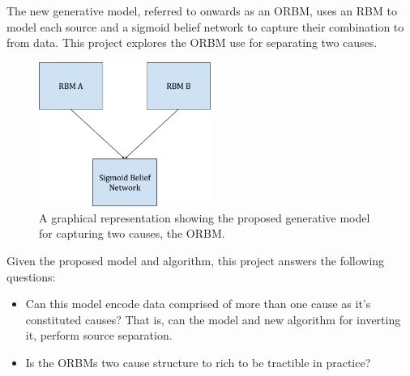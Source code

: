 The new generative model, referred to onwards as an ORBM, uses an RBM to model each source and a sigmoid belief network to capture their combination to from data. This project explores the ORBM use for separating two causes.

\begin{figure}[h]
\begin{center}
  \includegraphics[width = 0.5\textwidth]{Assets/ORBM_fig_1}
\caption{A graphical representation showing the proposed generative model for capturing two causes, the ORBM.}

\label{F:ORBM-fig-1}
\end{center}
\end{figure}

Given the proposed model and algorithm, this project answers the following questions:
\begin{itemize}
  \item Can this model encode data comprised of more than one cause as it's constituted causes? That is, can the model and new algorithm for inverting it, perform source separation.
  \item Is the ORBMs two cause structure to rich to be tractible in practice?
\end{itemize}
